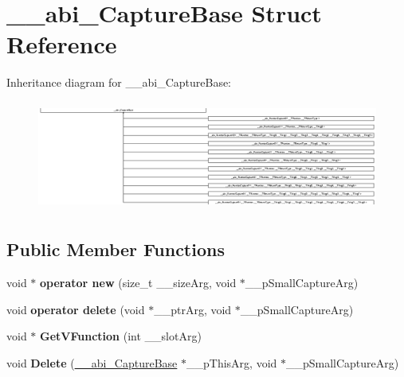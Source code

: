 \hypertarget{struct____abi___capture_base}{}\section{\+\_\+\+\_\+abi\+\_\+\+Capture\+Base Struct Reference}
\label{struct____abi___capture_base}
Inheritance diagram for \+\_\+\+\_\+abi\+\_\+\+Capture\+Base\+:\begin{figure}[H]
\begin{center}
\leavevmode
\includegraphics[height=3.632432cm]{d6/dd8/struct____abi___capture_base}
\end{center}
\end{figure}
\subsection*{Public Member Functions}
\begin{DoxyCompactItemize}
\item 
\mbox{\label{struct____abi___capture_base_aa50f15168936ae6f192ee7558a79cc93}} 
void $\ast$ {\bfseries operator new} (size\+\_\+t \+\_\+\+\_\+size\+Arg, void $\ast$\+\_\+\+\_\+p\+Small\+Capture\+Arg)
\item 
\mbox{\label{struct____abi___capture_base_a28a7357092afb42d87ff4415206ed57a}} 
void {\bfseries operator delete} (void $\ast$\+\_\+\+\_\+ptr\+Arg, void $\ast$\+\_\+\+\_\+p\+Small\+Capture\+Arg)
\item 
\mbox{\label{struct____abi___capture_base_ab037720b99de29924fcbe503f0d4e3a4}} 
void $\ast$ {\bfseries Get\+V\+Function} (int \+\_\+\+\_\+slot\+Arg)
\item 
\mbox{\label{struct____abi___capture_base_ad45dbb5a23a1e47eba6397b626875e9a}} 
void {\bfseries Delete} (\hyperlink{struct____abi___capture_base}{\+\_\+\+\_\+abi\+\_\+\+Capture\+Base} $\ast$\+\_\+\+\_\+p\+This\+Arg, void $\ast$\+\_\+\+\_\+p\+Small\+Capture\+Arg)
\end{DoxyCompactItemize}
